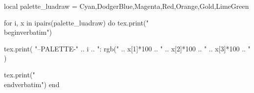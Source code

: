 \documentclass{article}
\begin{document}
\begin{luacode}
local palette_luadraw = {Cyan,DodgerBlue,Magenta,Red,Orange,Gold,LimeGreen}

for i, x in ipairs(palette_luadraw) do
  tex.print("\\begin{verbatim}")

  tex.print(
       "--PALETTE-"
    .. i .. ": rgb("
    .. x[1]*100 .. "%, "
    .. x[2]*100 .. "%, "
    .. x[3]*100 .. "%);"
  )

  tex.print("\\end{verbatim}")
end
\end{luacode}
\end{document}

